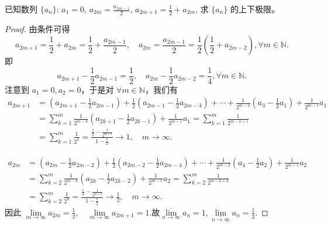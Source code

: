 \documentclass[lang=cn,newtx,10pt,scheme=chinese]{../Template/elegantbook}
\begin{document}
\begin{example}
已知数列 $\{a_n\}$: $a_1 = 0$, $a_{2m} = \frac{a_{2m-1}}{2}$, $a_{2m+1} = \frac{1}{2} + a_{2m}$, 求 $\{a_n\}$ 的上下极限。
\end{example}
\begin{proof}
由条件可得  
\[
a_{2m+1}=\frac{1}{2}+a_{2m}=\frac{1}{2}+\frac{a_{2m-1}}{2},\quad a_{2m}=\frac{a_{2m-1}}{2}=\frac{1}{2}\left( \frac{1}{2}+a_{2m-2} \right),\forall m\in \mathbb{N}.
\]
即  
\[
a_{2m+1}-\frac{1}{2}a_{2m-1}=\frac{1}{2},\quad a_{2m}-\frac{1}{2}a_{2m-2}=\frac{1}{4},\forall m\in \mathbb{N}.
\]
注意到 $a_1=0,a_2=0$，于是对 $\forall m\in \mathbb{N}$，我们有  
\begin{align*}
a_{2m+1}&=\left( a_{2m+1}-\frac{1}{2}a_{2m-1} \right) +\frac{1}{2}\left( a_{2m-1}-\frac{1}{2}a_{2m-3} \right) +\cdots +\frac{1}{2^{m-2}}\left( a_3-\frac{1}{2}a_1 \right) +\frac{1}{2^{m-1}}a_1 \\
&=\sum_{k=1}^m{\frac{1}{2^{m-k}}\left( a_{2k+1}-\frac{1}{2}a_{2k-1} \right)}+\frac{1}{2^{m-1}}a_1=\sum_{k=1}^m{\frac{1}{2^{m-k+1}}} \\
&=\sum_{k=1}^m{\frac{1}{2^k}}=\frac{\frac{1}{2}-\frac{1}{2^{m+1}}}{1-\frac{1}{2}}\rightarrow 1,\quad m\rightarrow \infty.
\end{align*}

\begin{align*}
a_{2m}&=\left( a_{2m}-\frac{1}{2}a_{2m-2} \right) +\frac{1}{2}\left( a_{2m-2}-\frac{1}{2}a_{2m-4} \right) +\cdots +\frac{1}{2^{m-2}}\left( a_4-\frac{1}{2}a_2 \right) +\frac{1}{2^{m-1}}a_2 \\
&=\sum_{k=2}^m{\frac{1}{2^{m-k}}\left( a_{2k}-\frac{1}{2}a_{2k-2} \right)}+\frac{1}{2^{m-1}}a_2=\sum_{k=2}^m{\frac{1}{2^{m-k+2}}} \\
&=\sum_{k=2}^m{\frac{1}{2^k}}=\frac{\frac{1}{4}-\frac{1}{2^{m+2}}}{1-\frac{1}{2}}\rightarrow \frac{1}{2},\quad m\rightarrow \infty.
\end{align*}
因此  
$\underset{m\rightarrow \infty}{\lim}a_{2m}=\frac{1}{2},\quad \underset{m\rightarrow \infty}{\lim}a_{2m+1}=1$.故$\underset{n\rightarrow \infty}{\overline{\lim }}a_n=1,\underset{n\rightarrow \infty}{\underline{\lim }}a_n=\frac{1}{2}.$
\end{proof}
\end{document}
